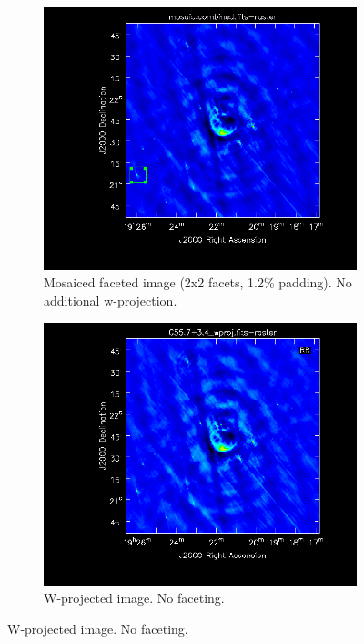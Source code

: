 \documentclass[a4paper,10pt]{article}
\begin{document}
\begin{figure}[h!]
  \centering
 \begin{subfigure}[b]{0.49\textwidth}
    \centering
    \includegraphics[width=\textwidth]{images/mosaic.png}
    \caption{Mosaiced faceted image (2x2 facets, 1.2\% padding). No additional w-projection.}
 \end{subfigure}
 \begin{subfigure}[b]{0.49\textwidth}
    \centering
    \includegraphics[width=\textwidth]{images/wproj.png}
    \caption{W-projected image. No faceting.}

\end{subfigure}
\end{figure}
\end{document}
